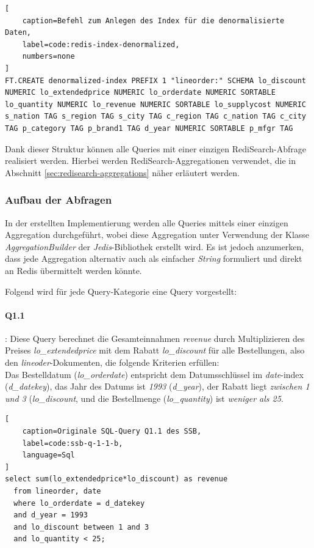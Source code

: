 \begin{lstlisting}[
    caption=Befehl zum Anlegen des Index für die denormalisierte Daten,
    label=code:redis-index-denormalized,
    numbers=none
]
FT.CREATE denormalized-index PREFIX 1 "lineorder:" SCHEMA lo_discount NUMERIC lo_extendedprice NUMERIC lo_orderdate NUMERIC SORTABLE lo_quantity NUMERIC lo_revenue NUMERIC SORTABLE lo_supplycost NUMERIC s_nation TAG s_region TAG s_city TAG c_region TAG c_nation TAG c_city TAG p_category TAG p_brand1 TAG d_year NUMERIC SORTABLE p_mfgr TAG
\end{lstlisting}



Dank dieser Struktur können alle Queries mit einer einzigen RediSearch-Abfrage realisiert werden. Hierbei werden RediSearch-Aggregationen verwendet, die in Abschnitt \ref{sec:redisearch-aggregations} näher erläutert werden.



\subsubsection{Aufbau der Abfragen}
In der erstellten Implementierung werden alle Queries mittels einer einzigen Aggregation durchgeführt, wobei diese Aggregation unter Verwendung der Klasse\\ \emph{AggregationBuilder} der \emph{Jedis}-Bibliothek erstellt wird.
Es ist jedoch anzumerken, dass jede Aggregation alternativ auch als einfacher \emph{String} formuliert und direkt an Redis übermittelt werden könnte.

Folgend wird für jede Query-Kategorie eine Query vorgestellt:

\paragraph{Q1.1}: Diese Query berechnet die Gesamteinnahmen \emph{revenue} durch Multiplizieren des Preises \emph{lo\_extendedprice} mit dem Rabatt \emph{lo\_discount} für alle Bestellungen, also den \emph{lineoder}-Dokumenten, die folgende Kriterien erfüllen:\\
Das Bestelldatum (\emph{lo\_orderdate}) entspricht dem Datumsschlüssel im \emph{date}-index\\
(\emph{d\_datekey}), das Jahr des Datums ist \emph{1993} (\emph{d\_year}), der Rabatt liegt \emph{zwischen 1 und 3} (\emph{lo\_discount}, und die Bestellmenge (\emph{lo\_quantity}) ist \emph{weniger als 25}. 

\begin{lstlisting}[
    caption=Originale SQL-Query Q1.1 des SSB,
    label=code:ssb-q-1-1-b,
    language=Sql
]
select sum(lo_extendedprice*lo_discount) as revenue
  from lineorder, date
  where lo_orderdate = d_datekey
  and d_year = 1993
  and lo_discount between 1 and 3
  and lo_quantity < 25;
\end{lstlisting}


